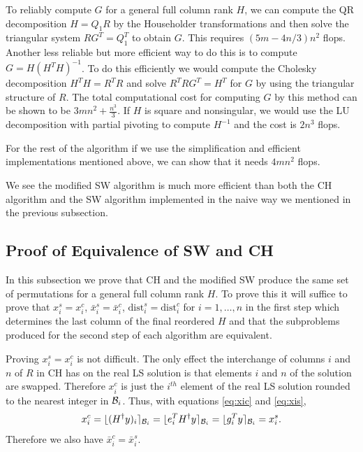 \documentclass[12pt,Bold,letterpaper]{mcgilletdclass}
\newcommand{\be}{\begin{equation}}
\newcommand{\ee}{\end{equation}}
\newcommand{\dist}{\mathrm{dist}}
\newcommand{\vsp}{\vspace{\baselineskip}}
\begin{document}
To reliably compute $G$ for a general full column rank $H$,
we can compute the  QR decomposition $H=Q_1R$ by the Householder transformations
and then solve the triangular system  $RG^T=Q_1^T$ to obtain $G$.
This requires $(5m-4n/3)n^2$ flops. 
Another less reliable but more efficient way to do this is to compute $G=H(H^TH)^{-1}$. 
To do this efficiently we would compute the Cholesky decomposition  $H^TH = R^TR$ and solve 
$R^TRG^T = H^T$ for $G$ by using the triangular structure of $R$. 
The total computational cost for computing $G$ by this method can be shown to be $3mn^2+\frac{n^3}{3}$.
If $H$ is square and nonsingular, we would use the LU decomposition with partial pivoting to compute $H^{-1}$
and the cost is $2n^3$ flops.

For the rest of the algorithm if we use the simplification and efficient implementations
mentioned above, we can show that it needs $4mn^2$ flops. 

We see the modified SW algorithm is much more efficient than both the CH algorithm
and the SW algorithm implemented in the naive way we mentioned in the previous subsection.

\vsp \subsection{Proof of Equivalence of SW and CH}
In this subsection we prove that  CH and  the modified  SW produce the same set of permutations
for a general full column rank $H$.
To prove this it will suffice to prove that $x_i^s = x_i^c$, $\bar{x}_i^s =\bar{x}_i^c$,
$\dist_i^s = \dist_i^c$ for $i=1, \ldots, n$ in the first step which determines the last column of the final reordered $H$
and that the subproblems produced for the second step of
each algorithm are equivalent. 

Proving $x_i^s = x_i^c$ is not difficult.
The only effect the interchange of columns $i$  and $n$ of $R$ in CH  
has on the real LS solution is that elements $i$ and $n$ of the solution are swapped.
Therefore $x_i^c$ is just the $i^{th}$ element of the real LS
solution rounded to the nearest integer in ${{\cal B}_i }$. 
Thus, with equations \eqref{eq:xic} and \eqref{eq:xis},
\be
x_i^c=   \lfloor (H^{\dagger}y)_i  \rceil_{{\cal B}_i }
=  \lfloor e_i^T H^{\dagger}y   \rceil_{{\cal B}_i }
=  \lfloor g_i^T  y \rceil_{{\cal B}_i } =x_i^s.
\label{eq:xics}
\ee
Therefore we also have $\bar{x}_i^c=\bar{x}_i^s$.
\end{document}
